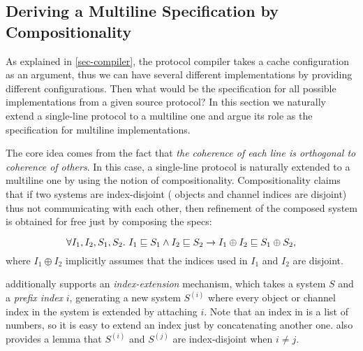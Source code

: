 \documentclass[sigplan,10pt,review,anonymous,screen]{acmart}\settopmatter{printfolios=true,printccs=false,printacmref=false}
\begin{document}
\subsection{Deriving a Multiline Specification by Compositionality}
\label{sec-multiline}


As explained in \autoref{sec-compiler}, the protocol compiler takes a cache configuration as an argument, thus we can have several different implementations by providing different configurations.
Then what would be the specification for all possible implementations from a given source protocol?
In this section we naturally extend a single-line \hemiola{} protocol to a multiline one and argue its role as the specification for multiline implementations.

The core idea comes from the fact that \emph{the coherence of each line is orthogonal to coherence of others}.
In this case, a single-line \hemiola{} protocol is naturally extended to a multiline one by using the notion of compositionality.
Compositionality claims that if two systems are index-disjoint (\ie{} objects and channel indices are disjoint) thus not communicating with each other, then refinement of the composed system is obtained for free just by composing the specs:
\begin{theorem}[Compositionality]
  \begin{displaymath}
    \forall I_1, I_2, S_1, S_2.\ \refines{I_1}{S_1} \land \refines{I_2}{S_2} \to
    \refines{I_1 \oplus I_2}{S_1 \oplus S_2},
  \end{displaymath}
  where $I_1 \oplus I_2$ implicitly assumes that the indices used in $I_1$ and $I_2$ are disjoint.
\end{theorem}

\hemiola{} additionally supports an \emph{index-extension} mechanism, which takes a system $S$ and a \emph{prefix index} $i$, generating a new system $S^{(i)}$ where every object or channel index in the system is extended by attaching $i$.
Note that an index in \hemiola{} is a list of numbers, so it is easy to extend an index just by concatenating another one.
\hemiola{} also provides a lemma that $S^{(i)}$ and $S^{(j)}$ are index-disjoint when $i \neq j$.
\end{document}
